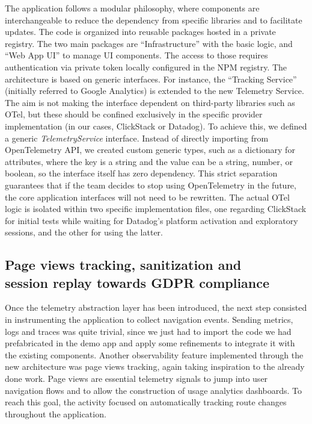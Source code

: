 \documentclass[12pt,a4paper,openright,twoside]{book}
\begin{document}
The application follows a modular philosophy, where components are interchangeable to reduce the dependency from specific libraries and to facilitate updates. The code is organized into reusable packages hosted in a private registry. The two main packages are ``Infrastructure'' with the basic logic, and ``Web App UI'' to manage UI components. The access to those requires authentication via private token locally configured in the NPM registry. 
The architecture is based on generic interfaces. For instance, the ``Tracking Service'' (initially referred to Google Analytics) is extended to the new Telemetry Service. The aim is not making the interface dependent on third-party libraries such as OTel, but these should be confined exclusively in the specific provider implementation (in our cases, ClickStack or Datadog). To achieve this, we defined a generic \textit{TelemetryService} interface. Instead of directly importing from OpenTelemetry API, we created custom generic types, such as a dictionary for attributes, where the key is a string and the value can be a string, number, or boolean, so the interface itself has zero dependency. This strict separation guarantees that if the team decides to stop using OpenTelemetry in the future, the core application interfaces will not need to be rewritten. The actual OTel logic is isolated within two specific implementation files, one regarding ClickStack for initial tests while waiting for Datadog's platform activation and exploratory sessions, and the other for using the latter. 

\subsection{Page views tracking, sanitization and \\ session replay towards GDPR compliance}

Once the telemetry abstraction layer has been introduced, the next step consisted in instrumenting the application to collect navigation events. Sending metrics, logs and traces was quite trivial, since we just had to import the code we had prefabricated in the demo app and apply some refinements to integrate it with the existing components. Another observability feature implemented through the new architecture was page views tracking, again taking inspiration to the already done work. Page views are essential telemetry signals to jump into user navigation flows and to allow the construction of usage analytics dashboards. To reach this goal, the activity focused on automatically tracking route changes throughout the application. 
\end{document}
